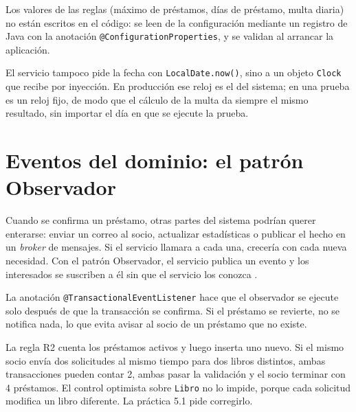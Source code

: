 Los valores de las reglas (máximo de préstamos, días de préstamo, multa diaria) no están escritos en el código: se leen de la configuración mediante un registro de Java con la anotación \texttt{@ConfigurationProperties}, y se validan al arrancar la aplicación.



El servicio tampoco pide la fecha con \texttt{LocalDate.now()}, sino a un objeto \texttt{Clock} que recibe por inyección. En producción ese reloj es el del sistema; en una prueba es un reloj fijo, de modo que el cálculo de la multa da siempre el mismo resultado, sin importar el día en que se ejecute la prueba.

\section{Eventos del dominio: el patrón Observador}

Cuando se confirma un préstamo, otras partes del sistema podrían querer enterarse: enviar un correo al socio, actualizar estadísticas o publicar el hecho en un \emph{broker} de mensajes. Si el servicio llamara a cada una, crecería con cada nueva necesidad. Con el patrón Observador, el servicio publica un evento y los interesados se suscriben a él sin que el servicio los conozca \cite{gamma1994design}.



La anotación \texttt{@TransactionalEventListener} hace que el observador se ejecute solo después de que la transacción se confirma. Si el préstamo se revierte, no se notifica nada, lo que evita avisar al socio de un préstamo que no existe.

\begin{avisoBox}[title={Una condición de carrera que queda abierta}]
	La regla R2 cuenta los préstamos activos y luego inserta uno nuevo. Si el mismo socio envía dos solicitudes al mismo tiempo para dos libros distintos, ambas transacciones pueden contar 2, ambas pasar la validación y el socio terminar con 4 préstamos. El control optimista sobre \texttt{Libro} no lo impide, porque cada solicitud modifica un libro diferente. La práctica 5.1 pide corregirlo.
\end{avisoBox}

